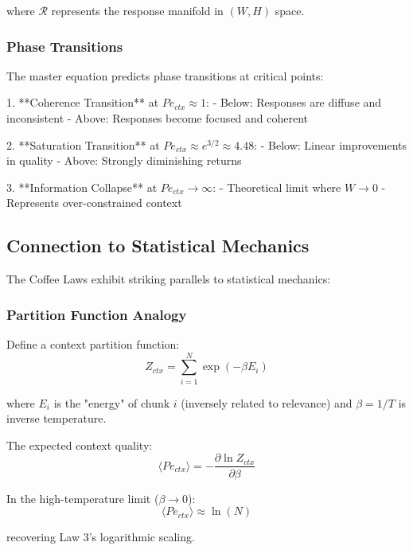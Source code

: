 \documentclass[conference]{IEEEtran}
\begin{document}
where $\mathcal{R}$ represents the response manifold in $(W, H)$ space.

\subsubsection{Phase Transitions}

The master equation predicts phase transitions at critical points:

1. **Coherence Transition** at $Pe_{ctx} \approx 1$:
   - Below: Responses are diffuse and inconsistent
   - Above: Responses become focused and coherent

2. **Saturation Transition** at $Pe_{ctx} \approx e^{3/2} \approx 4.48$:
   - Below: Linear improvements in quality
   - Above: Strongly diminishing returns

3. **Information Collapse** at $Pe_{ctx} \rightarrow \infty$:
   - Theoretical limit where $W \rightarrow 0$
   - Represents over-constrained context

\subsection{Connection to Statistical Mechanics}

The Coffee Laws exhibit striking parallels to statistical mechanics:

\subsubsection{Partition Function Analogy}

Define a context partition function:
\begin{equation}
Z_{ctx} = \sum_{i=1}^N \exp\left(-\beta E_i\right)
\end{equation}

where $E_i$ is the "energy" of chunk $i$ (inversely related to relevance) and $\beta = 1/T$ is inverse temperature.

The expected context quality:
\begin{equation}
\langle Pe_{ctx} \rangle = -\frac{\partial \ln Z_{ctx}}{\partial \beta}
\end{equation}

In the high-temperature limit ($\beta \rightarrow 0$):
\begin{equation}
\langle Pe_{ctx} \rangle \approx \ln(N)
\end{equation}

recovering Law 3's logarithmic scaling.
\end{document}
